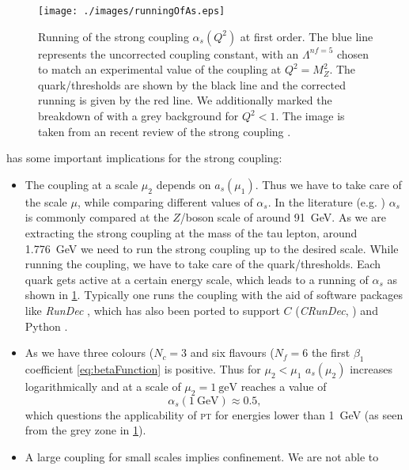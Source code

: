 \documentclass[../../index.tex]{subfiles}
\begin{document}
\begin{figure}
  \centering \texttt{[image: ./images/runningOfAs.eps]}
  \caption{Running of the strong coupling \(\alpha_s(Q^2)\) at first order. The
    blue line represents the uncorrected coupling constant, with an
    \(\Lambda^{nf=5}\) chosen to match an experimental value of the coupling at
    \(Q^2=M_Z^2\). The quark\-/thresholds are shown by the black line and the
    corrected running is given by the red line. We additionally marked the
    breakdown of  with a grey background for \(Q^2<1\). The image is
    taken from an recent review of the strong coupling \cite{Deur2016}.}
  \label{fig:runningOfAs}
\end{figure}

 has some important implications for the
strong coupling:
\begin{itemize}
\item The coupling at a scale \(\mu_2\) depends on \(a_s(\mu_1)\). Thus we have
  to take care of the scale \(\mu\), while comparing different values of
  \(\alpha_s\). In the literature (e.g. \cite{pdg2016}) \(\alpha_s\) is commonly
  compared at the \(Z\)\-/boson scale of around \SI{91}{\giga\eV}. As we are
  extracting the strong coupling at the mass of the tau lepton, around
  \SI{1.776}{\giga\eV} we need to run the strong coupling up to the desired
  scale. While running the coupling, we have to take care of the
  quark\-/thresholds. Each quark gets active at a certain energy scale, which
  leads to a running of \(\alpha_s\) as shown in \cref{fig:runningOfAs}.
  Typically one runs the coupling with the aid of software packages like
  \textit{RunDec} \cite{Chetyrkin2000,Herren2017}, which has also been ported to
  support \(C\) (\textit{CRunDec}, \cite{Schmidt2012}) and Python
  \cite{Straub2016}.
\item As we have three colours (\(N_c=3\) and six flavours (\(N_f=6\) the first
  \(\beta_1\) coefficient \ref{eq:betaFunction} is positive. Thus for
  \(\mu_2<\mu_1\) \(a_s(\mu_2)\) increases logarithmically and at a scale of
  \(\mu_2=\SI{1}{\g\eV}\) reaches a value of
  \begin{equation}
    \alpha_s(\SI{1}{\giga\eV}) \approx 0.5,
  \end{equation}
  which questions the applicability of \textsc{pt} for energies lower than
  \SI{1}{\giga\eV} (as seen from the grey zone in \cref{fig:runningOfAs}).
\item A large coupling for small scales implies confinement. We are not able to

\end{itemize}
\end{document}
